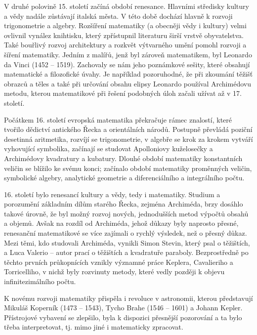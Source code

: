       V druhé polovině 15. století začíná období renesance. Hlavními středisky kultury a vědy nadále
      zůstávají italská města. V této době dochází hlavně k rozvoji trigonometrie a algebry.
      Rozšíření matematiky (a obecněji vědy i kultury) velmi ovlivnil vynález knihtisku, který
      zpřístupnil literaturu širší vrstvě obyvatelstva. Také bouřlivý rozvoj architektury a rozkvět
      výtvarného umění pomohl rozvoji a šíření matematiky. Jedním z malířů, jenž byl zároveň
      matematikem, byl Leonardo da Vinci (1452 – 1519). Zachovaly se nám jeho poznámkové sešity,
      které obsahují matematické a filozofické úvahy. Je například pozoruhodné, že při zkoumání
      těžišť obrazců a těles a také při určování obsahu elipsy Leonardo používal Archimédovu metodu,
      kterou matematikové při řešení podobných úloh začali užívat až v 17. století.

      Počátkem 16. století evropská matematika překračuje rámec znalostí, které tvořilo dědictví
      antického Řecka a orientálních národů. Postupně převládá poziční desetinná aritmetika, rozvíjí
      se trigonometrie, v algebře se krok za krokem vytváří vyhovující symbolika, začínají se
      studovat Apolloniovy kuželosečky a Archimédovy kvadratury a kubatury. Dlouhé období matematiky
      konstantních veličin se blížilo ke svému konci; začínalo období matematiky proměnných veličin,
      symbolické algebry, analytické geometrie a diferenciálního a integrálního počtu.

      16. století bylo renesancí kultury a vědy, tedy i matematiky. Studium a porozumění základním
      dílům starého Řecka, zejména Archiméda, brzy dosáhlo takové úrovně, že byl možný rozvoj
      nových, jednodušších metod výpočtů obsahů a objemů. Avšak na rozdíl od Archiméda, jehož důkazy
      byly naprosto přesné, renesanční matematikové se více zajímali o rychlý výsledek, než o přesný
      důkaz. Mezi těmi, kdo studovali Archiméda, vynikli Simon Stevin, který psal o těžištích, a
      Luca Valerio – autor prací o těžištích a kvadratuře paraboly. Bezprostředně po těchto prvních
      průkopnících vznikly významné práce Keplera, Cavalieriho a Torricelliho, v nichž byly
      rozvinuty metody, které vedly později k objevu infinitezimálního počtu.

      K novému rozvoji matematiky přispěla i revoluce v astronomii, kterou představují Mikuláš
      Koperník (1473 – 1543), Tycho Brahe (1546 – 1601) a Johann Kepler. Přístrojové vybavení se
      zlepšilo, byla k dispozici přesnější pozorování a ta bylo třeba interpretovat, tj. mimo jiné i
      matematicky zpracovat.

